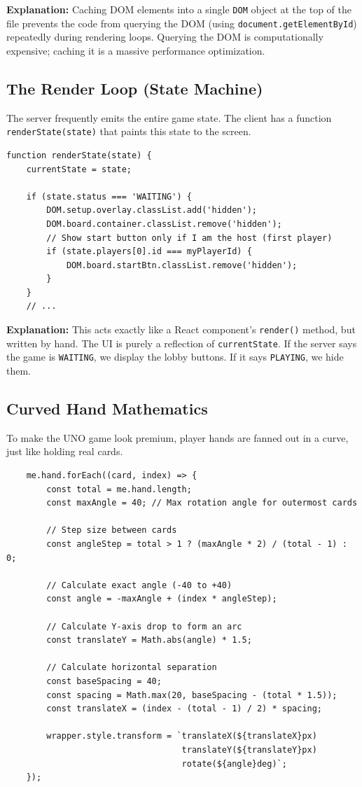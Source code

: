 \documentclass[11pt,a4paper]{article}
\begin{document}
\textbf{Explanation:}
Caching DOM elements into a single \texttt{DOM} object at the top of the file prevents the code from querying the DOM (using \texttt{document.getElementById}) repeatedly during rendering loops. Querying the DOM is computationally expensive; caching it is a massive performance optimization.

\subsection{The Render Loop (State Machine)}
The server frequently emits the entire game state. The client has a function \texttt{renderState(state)} that paints this state to the screen.

\begin{verbatim}
function renderState(state) {
    currentState = state;

    if (state.status === 'WAITING') {
        DOM.setup.overlay.classList.add('hidden');
        DOM.board.container.classList.remove('hidden');
        // Show start button only if I am the host (first player)
        if (state.players[0].id === myPlayerId) {
            DOM.board.startBtn.classList.remove('hidden');
        }
    }
    // ...
\end{verbatim}

\textbf{Explanation:} 
This acts exactly like a React component's \texttt{render()} method, but written by hand. The UI is purely a reflection of \texttt{currentState}. If the server says the game is \texttt{WAITING}, we display the lobby buttons. If it says \texttt{PLAYING}, we hide them.

\subsection{Curved Hand Mathematics}
To make the UNO game look premium, player hands are fanned out in a curve, just like holding real cards.

\begin{verbatim}
    me.hand.forEach((card, index) => {
        const total = me.hand.length;
        const maxAngle = 40; // Max rotation angle for outermost cards
        
        // Step size between cards
        const angleStep = total > 1 ? (maxAngle * 2) / (total - 1) : 0;
        
        // Calculate exact angle (-40 to +40)
        const angle = -maxAngle + (index * angleStep);
        
        // Calculate Y-axis drop to form an arc
        const translateY = Math.abs(angle) * 1.5;

        // Calculate horizontal separation
        const baseSpacing = 40; 
        const spacing = Math.max(20, baseSpacing - (total * 1.5));
        const translateX = (index - (total - 1) / 2) * spacing;

        wrapper.style.transform = `translateX(${translateX}px) 
                                   translateY(${translateY}px) 
                                   rotate(${angle}deg)`;
    });
\end{verbatim}
\end{document}
